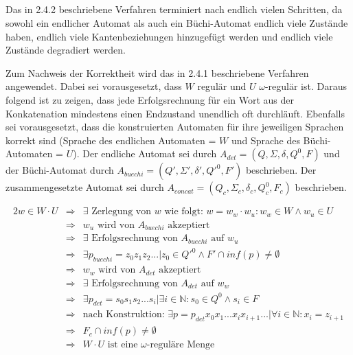 \documentclass[10pt,a4paper,oneside,ngerman,numbers=noenddot]{scrartcl}
\begin{document}
	\subsection{} %
		Das in 2.4.2 beschriebene Verfahren terminiert nach endlich vielen Schritten, da sowohl ein endlicher Automat als auch ein Büchi-Automat endlich viele Zustände haben, endlich viele Kantenbeziehungen hinzugefügt werden und endlich viele Zustände degradiert werden.
		
		Zum Nachweis der Korrektheit wird das in 2.4.1 beschriebene Verfahren angewendet. Dabei sei vorausgesetzt, dass \(W\) regulär und \(U\) \(\omega\)-regulär ist. Daraus folgend ist zu zeigen, dass jede Erfolgsrechnung für ein Wort aus der Konkatenation mindestens einen Endzustand unendlich oft durchläuft. Ebenfalls sei vorausgesetzt, dass die konstruierten Automaten für ihre jeweiligen Sprachen korrekt sind (Sprache des endlichen Automaten = \(W\) und Sprache des Büchi-Automaten = \(U\)). Der endliche Automat sei durch \(A_{det} = (Q, \Sigma, \delta, Q^{0}, F)\) und der Büchi-Automat durch \(A_{buechi} = (Q', \Sigma ', \delta ', Q'^{0}, F')\) beschrieben. Der zusammengesetzte Automat sei durch \(A_{concat} = (Q_{c}, \Sigma_{c}, \delta_{c}, Q_{c}^{0}, F_{c})\) beschrieben.
		
		\begin{alignat*}{2}
			w \in W \cdot U &\Rightarrow & \exists \text{ Zerlegung von \(w\) wie folgt: }w = w_{w} \cdot w_{u} : w_{w} \in W \wedge w_{u} \in U \\
							&\Rightarrow & w_{u} \text{ wird von \(A_{buechi}\) akzeptiert} \\
							&\Rightarrow & \exists \text{ Erfolgsrechnung von \(A_{buechi}\) auf \(w_{u}\)} \\
							&\Rightarrow & \exists p_{buechi} = z_{0}z_{1}z_{2}... | z_{0} \in Q'^{0} \wedge F' \cap inf(p) \neq \emptyset \\
							&\Rightarrow & w_{w} \text{ wird von \(A_{det}\) akzeptiert} \\
							&\Rightarrow & \exists \text{ Erfolgsrechnung von \(A_{det}\) auf \(w_{w}\)} \\
							&\Rightarrow & \exists p_{det} = s_{0}s_{1}s_{2}...s_{i} | \exists i \in \mathbb{N} : s_{0} \in Q^{0} \wedge s_{i} \in F \\
							&\Rightarrow & \text{nach Konstruktion: } \exists p = p_{det}x_{0}x_{1}...x_{i}x_{i+1}... | \forall i \in \mathbb{N} : x_{i} = z_{i+1}  \\
							&\Rightarrow & F_{c} \cap inf(p) \neq \emptyset \\
							&\Rightarrow & W \cdot U \text{ ist eine \(\omega\)-reguläre Menge}
		\end{alignat*}
	\subsection{} %
\end{document}
